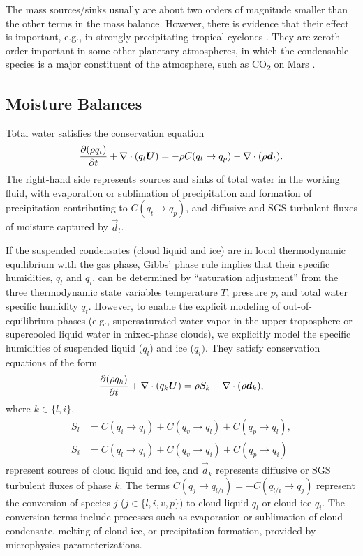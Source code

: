 \documentclass{article}
\begin{document}
The mass sources/sinks usually are about two orders of magnitude smaller than the other terms in the mass balance. However, there is evidence that their effect is important, e.g., in strongly precipitating tropical cyclones \citep{Qiu93a,Lackmann04a}. They are zeroth-order important in some other planetary atmospheres, in which the condensable species is a major constituent of the atmosphere, such as CO\textsubscript{2} on Mars \cite[e.g.,][]{Soto15a}.

\subsection{Moisture Balances}

Total water satisfies the conservation equation
\begin{equation}
\frac{\partial (\rho q_t)}{\partial t} + \nabla \cdot (q_t \boldsymbol{{U}}) = - \rho C(q_t \rightarrow q_p) - \nabla \cdot (\rho \boldsymbol{{d}}_t).   
\label{eq:governing_equations/moisture}
\end{equation}
The right-hand side represents sources and sinks of total water in the working fluid, with evaporation or sublimation of precipitation and formation of precipitation contributing to $C(q_t \rightarrow q_p)$, and diffusive and SGS turbulent fluxes of moisture captured by $\vec{d}_t$. 

If the suspended condensates (cloud liquid and ice) are in local thermodynamic equilibrium with the gas phase, Gibbs' phase rule implies that their specific humidities, $q_l$ and $q_i$, can be determined by ``saturation adjustment'' from the three thermodynamic state variables temperature $T$, pressure $p$, and total water specific humidity $q_t$. However, to enable the explicit modeling of out-of-equilibrium phases (e.g., supersaturated water vapor in the upper troposphere or supercooled liquid water in mixed-phase clouds), we explicitly model the specific humidities of suspended liquid ($q_l$) and ice ($q_i)$. They satisfy conservation equations of the form
\begin{equation}
\frac{\partial (\rho q_k)}{\partial t} + \nabla \cdot (q_k \boldsymbol{{U}}) = \rho S_k  -\nabla \cdot (\rho \boldsymbol{{d}}_{k}),   
\label{eq:governing_equations/condensate}
\end{equation}
where $k \in \{l, i\}$,
\begin{align}
    S_l & = C(q_i \rightarrow q_l) + C(q_v \rightarrow q_l) + C(q_p \rightarrow q_l), \\
    S_i & = C(q_l \rightarrow q_i) + C(q_v \rightarrow q_i) + C(q_p \rightarrow q_i)
\end{align}
represent sources of cloud liquid and ice, and $\vec{d}_{k}$ represents diffusive or SGS turbulent fluxes of phase $k$. The terms $C(q_j \rightarrow q_{l/i}) = - C(q_{l/i} \rightarrow q_j)$ represent the conversion of species $j$ ($j \in \{l, i, v, p\}$) to cloud liquid $q_l$ or cloud ice $q_i$. The conversion terms include processes such as evaporation or sublimation of cloud condensate, melting of cloud ice, or precipitation formation, provided by microphysics parameterizations.
 
\end{document}
